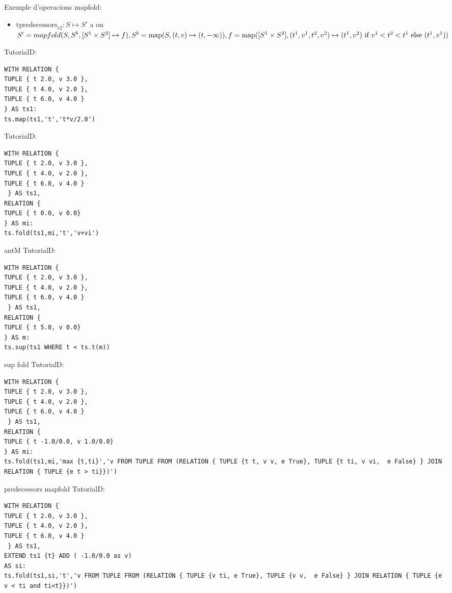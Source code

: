Exemple d'operacions mapfold:
\begin{itemize}
\item $\text{tpredecessors}_{v2}: S \mapsto S'$ a on $S'=
  mapfold(S,S^b,[S^1\times S^2]\mapsto f), S^b =
  \operatorname*{map}(S,(t,v)\mapsto(t,-\infty)), f=\operatorname*{map}([S^1\times
  S^2],(t^1,v^1,t^2,v^2)\mapsto (t^1,v^2) \text{ if } v^1<t^2<t^1
  \text{ else } (t^1,v^1))$
\end{itemize}




TutorialD:
\begin{verbatim}
WITH RELATION {
TUPLE { t 2.0, v 3.0 },
TUPLE { t 4.0, v 2.0 },
TUPLE { t 6.0, v 4.0 }
} AS ts1: 
ts.map(ts1,'t','t*v/2.0')
\end{verbatim}

TutorialD:
\begin{verbatim}
WITH RELATION {
TUPLE { t 2.0, v 3.0 },
TUPLE { t 4.0, v 2.0 },
TUPLE { t 6.0, v 4.0 }
 } AS ts1,
RELATION {
TUPLE { t 0.0, v 0.0}
} AS mi: 
ts.fold(ts1,mi,'t','v+vi')
\end{verbatim}

antM TutorialD:
\begin{verbatim}
WITH RELATION {
TUPLE { t 2.0, v 3.0 },
TUPLE { t 4.0, v 2.0 },
TUPLE { t 6.0, v 4.0 }
 } AS ts1,
RELATION {
TUPLE { t 5.0, v 0.0}
} AS m: 
ts.sup(ts1 WHERE t < ts.t(m))
\end{verbatim}

sup fold TutorialD:
\begin{verbatim}
WITH RELATION {
TUPLE { t 2.0, v 3.0 },
TUPLE { t 4.0, v 2.0 },
TUPLE { t 6.0, v 4.0 }
 } AS ts1,
RELATION {
TUPLE { t -1.0/0.0, v 1.0/0.0}
} AS mi: 
ts.fold(ts1,mi,'max {t,ti}','v FROM TUPLE FROM (RELATION { TUPLE {t t, v v, e True}, TUPLE {t ti, v vi,  e False} } JOIN RELATION { TUPLE {e t > ti}})')
\end{verbatim}

predecessors mapfold TutorialD:
\begin{verbatim}
WITH RELATION {
TUPLE { t 2.0, v 3.0 },
TUPLE { t 4.0, v 2.0 },
TUPLE { t 6.0, v 4.0 }
 } AS ts1,
EXTEND ts1 {t} ADD ( -1.0/0.0 as v)
AS si: 
ts.fold(ts1,si,'t','v FROM TUPLE FROM (RELATION { TUPLE {v ti, e True}, TUPLE {v v,  e False} } JOIN RELATION { TUPLE {e v < ti and ti<t}})')
\end{verbatim}









